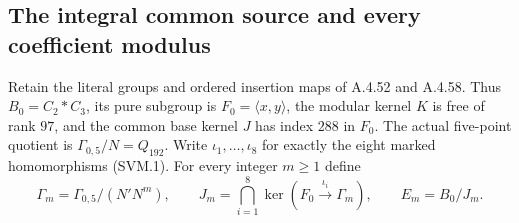 \subsection{The integral common source and every coefficient modulus}

Retain the literal groups and ordered insertion maps of
A.4.52 and A.4.58. Thus $B_0=C_2*C_3$, its pure subgroup is
$F_0=\langle x,y\rangle$, the modular kernel $K$ is free of
rank $97$, and the common base kernel $J$ has index $288$
in $F_0$. The actual five-point quotient is
$\Gamma_{0,5}/N=Q_{192}$. Write $\iota_1,\ldots,\iota_8$
for exactly the eight marked homomorphisms (SVM.1).
For every integer $m\geq1$ define
\[
 \Gamma_m=\Gamma_{0,5}/(N'N^m),\qquad
 J_m=\bigcap_{i=1}^8\ker(F_0\xrightarrow{\iota_i}\Gamma_m),
 \qquad E_m=B_0/J_m.
                                                        \tag{ICS.1}
\]

